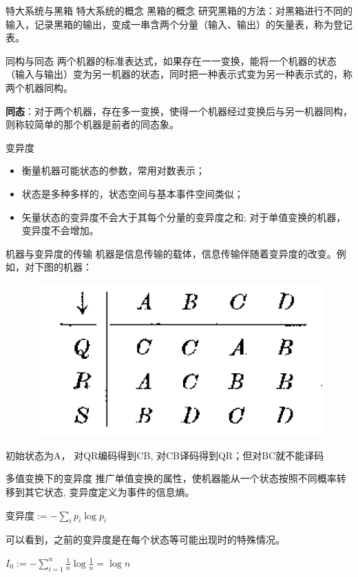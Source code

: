 \documentclass[12pt,AutoFakeBold,aspectratio=43,mathserif]{beamer}
\begin{document}
    	\begin{frame}{特大系统与黑箱}
    		特大系统的概念
    		黑箱的概念
    		研究黑箱的方法：对黑箱进行不同的输入，记录黑箱的输出，变成一串含两个分量（输入、输出）的矢量表，称为登记表。
    	\end{frame}
    	\begin{frame}{同构与同态}
    		两个机器的标准表达式，如果存在一一变换，能将一个机器的状态（输入与输出）变为另一机器的状态，同时把一种表示式变为另一种表示式的，称两个机器同构。
    		
    		
    		\textbf{同态}：对于两个机器，存在多一变换，使得一个机器经过变换后与另一机器同构，则称较简单的那个机器是前者的同态象。
    		
    		\end{frame}
		\begin{frame}{变异度}
			\begin{itemize}
				\item 衡量机器可能状态的参数，常用对数表示；
				\item 状态是多种多样的，状态空间与基本事件空间类似；
				\item 矢量状态的变异度不会大于其每个分量的变异度之和; 对于单值变换的机器，变异度不会增加。
			\end{itemize}
		\end{frame}
		\begin{frame}{机器与变异度的传输}
			\quad 机器是信息传输的载体，信息传输伴随着变异度的改变。例如，对下图的机器：
			\begin{figure}
                \centering
                \includegraphics[width=.4\textwidth]{figures/figure2_1.PNG}
            \end{figure}
			\quad 初始状态为A， 对QR编码得到CB, 对CB译码得到QR；但对BC就不能译码
		\end{frame}
		\begin{frame}{多值变换下的变异度}
			\quad 推广单值变换的属性，使机器能从一个状态按照不同概率转移到其它状态, 变异度定义为事件的信息熵。
			
			\quad $\text{变异度} := - \sum_i p_i \log p_i$
			
			\quad 可以看到，之前的变异度是在每个状态等可能出现时的特殊情况。
			
			\quad $I_0 := - \sum_{i = 1}^n \frac{1}{n}\log\frac{1}{n} = \log n$
			
		\end{frame}
\end{document}
